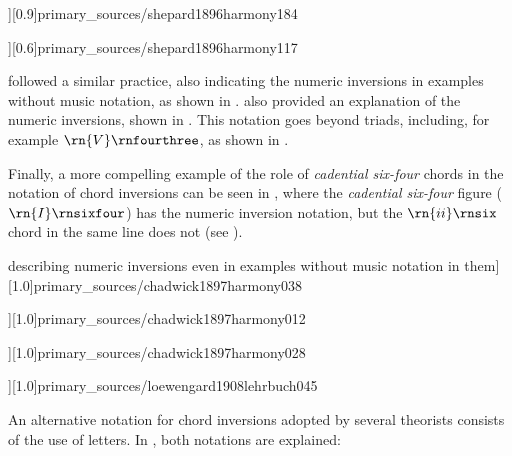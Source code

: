 \phdfigure[Numeric inversions in
\textcite[p.~184]{shepard1896harmony}][0.9]{primary_sources/shepard1896harmony184}

\phdfigure[Numeric inversions in plain-text, without
accompanying music notation
\parencite[p.~117]{shepard1896harmony}][0.6]{primary_sources/shepard1896harmony117}

\textcite{chadwick1897harmony} followed a similar practice,
also indicating the numeric inversions in examples without
music notation, as shown in
.
\textcite{chadwick1897harmony} also provided an explanation
of the numeric inversions, shown in
. This
notation goes beyond triads, including, for example
$\rn{V}\rnfourthree$, as shown in
.

Finally, a more compelling example of the role of
\emph{cadential six-four} chords in the notation of chord
inversions can be seen in \textcite{loewengard1908lehrbuch},
where the \emph{cadential six-four} figure
($\rn{I}\rnsixfour$) has the numeric inversion notation, but
the $\rn{ii}\rnsix$ chord in the same line does not (see
).

\phdfigure[\textcite[p.~38]{chadwick1897harmony} describing
numeric inversions even in examples without music notation
in them][1.0]{primary_sources/chadwick1897harmony038}

\phdfigure[Arabic-numeral inversions in
 \textcite[p.~12]{chadwick1897harmony}][1.0]{primary_sources/chadwick1897harmony012}

\phdfigure[A dominant seventh chord in second inversion in
\textcite[p.~28]{chadwick1897harmony}][1.0]{primary_sources/chadwick1897harmony028}

\phdfigure[Missing first inversion of the $\rn{ii}\rnsix$
chord (measure 6) in
\textcite[p.~45]{loewengard1908lehrbuch}][1.0]{primary_sources/loewengard1908lehrbuch045}

An alternative notation for chord inversions adopted by
several theorists consists of the use of letters. In
\textcite{cutter1902harmonic}, both notations are explained:

